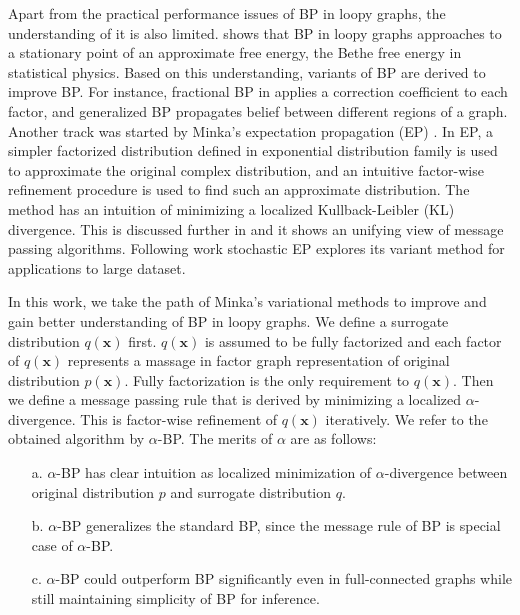 \documentclass[conference]{IEEEtran}
\begin{document}
Apart from the practical performance issues of BP in loopy graphs, the understanding of it is also limited. \cite{Yedidia:2000:GBP:3008751.3008848} shows that BP in loopy graphs approaches to a stationary point of an approximate free energy, the Bethe free energy in statistical physics. Based on this understanding, variants of BP are derived to improve BP. For instance, fractional BP in \cite{Wiegerinck:2002:FBP:2968618.2968673} applies a correction coefficient to each factor, and generalized BP \cite{Yedidia:2000:GBP:3008751.3008848} propagates belief between different regions of a graph. Another track was started by Minka's expectation propagation (EP) \cite{Minka:2001:EPA:647235.720257, Minka:2001:FAA:935427}. In EP, a simpler factorized distribution defined in exponential distribution family is used to approximate the original complex distribution, and an intuitive factor-wise refinement procedure is used to find such an approximate distribution. The method has an intuition of minimizing a localized Kullback-Leibler (KL) divergence. This is discussed further in \cite{divergence-measures-and-message-passing} and it shows an unifying view of message passing algorithms. Following work stochastic EP \cite{yingzhen2015sep} explores its variant method for applications to large dataset.

In this work, we take the path of Minka's variational methods to improve and gain better understanding of BP in loopy graphs.
We define a surrogate distribution $q(\bm{x})$ first. $q(\bm{x})$ is assumed to be fully factorized and each factor of $q(\bm{x})$ represents a massage in factor graph representation of original distribution $p(\bm{x})$. Fully factorization is the only requirement to $q(\bm{x})$. Then we define a message passing rule that is derived by minimizing a localized $\alpha$-divergence. This is factor-wise refinement of $q(\bm{x})$ iteratively. We refer to the obtained algorithm by $\alpha$-BP. The merits of $\alpha$ are as follows:
\begin{itemize}
\item[a.]{$\alpha$-BP has clear intuition as localized minimization of $\alpha$-divergence between original distribution $p$ and surrogate distribution $q$.}
\item[b.]{$\alpha$-BP generalizes the standard BP, since the message rule of BP is special case of $\alpha$-BP.}
\item[c.]{$\alpha$}-BP could outperform BP significantly even in full-connected graphs while still maintaining simplicity of BP for inference. 
\end{itemize}
\end{document}
